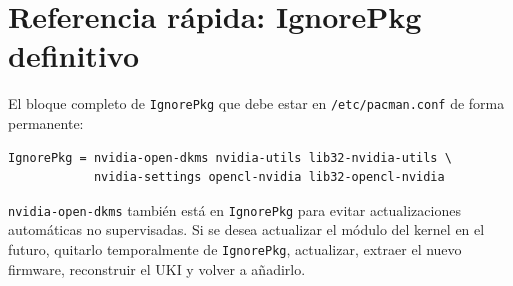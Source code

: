 \documentclass[12pt,a4paper]{article}
\begin{document}
\section{Referencia rápida: IgnorePkg definitivo}

El bloque completo de \texttt{IgnorePkg} que debe estar en
\texttt{/etc/pacman.conf} de forma permanente:

\begin{lstlisting}[style=bash]
IgnorePkg = nvidia-open-dkms nvidia-utils lib32-nvidia-utils \
            nvidia-settings opencl-nvidia lib32-opencl-nvidia
\end{lstlisting}

\begin{advertencia}
\texttt{nvidia-open-dkms} también está en \texttt{IgnorePkg} para evitar
actualizaciones automáticas no supervisadas. Si se desea actualizar el módulo
del kernel en el futuro, quitarlo temporalmente de \texttt{IgnorePkg},
actualizar, extraer el nuevo firmware, reconstruir el UKI y volver a añadirlo.
\end{advertencia}
\end{document}
